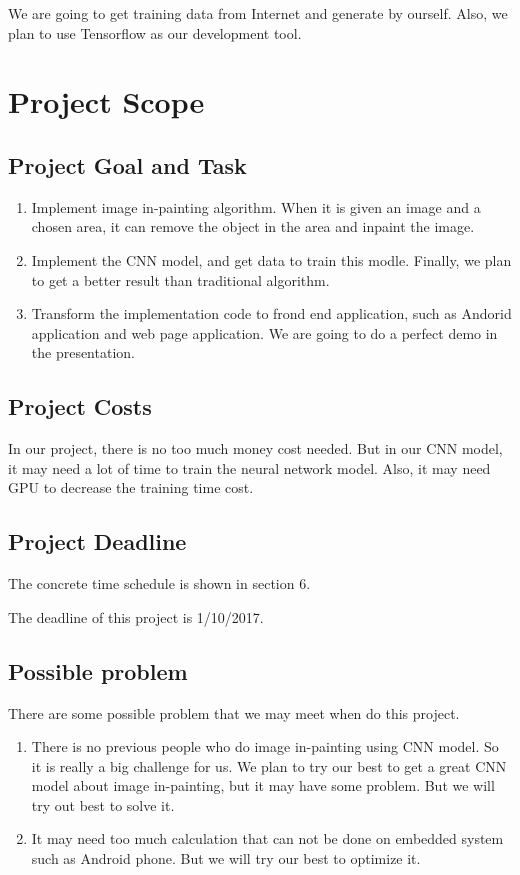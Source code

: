 \documentclass[12pt]{article}
\begin{document}
\qquad We are going to get training data from Internet and generate by ourself. Also, we plan to use Tensorflow as our development tool. 

\section{Project Scope}
\subsection{Project Goal and Task}
\begin{enumerate}[1.]
	\item Implement image in-painting algorithm. When it is given an image and a chosen area, it can remove the object in the area and inpaint the image.
	\item Implement the CNN model, and get data to train this modle. Finally, we plan to get a better result than traditional algorithm.
	\item Transform the implementation code to frond end application, such as Andorid application and web page application. We are going to do a perfect demo in the presentation. 
\end{enumerate}
\subsection{Project Costs}
\qquad In our project, there is no too much money cost needed. But in our CNN model, it may need a lot of time to train the neural network model. Also, it may need GPU to decrease the training time cost.
\subsection{Project Deadline}
\qquad The concrete time schedule is shown in section 6. 

\qquad The deadline of this project is 1/10/2017.
\subsection{Possible problem}
There are some possible problem that we may meet when do this project.
\begin{enumerate}[1.]
	\item There is no previous people who do image in-painting using CNN model. So it is really a big challenge for us. We plan to try our best to get a great CNN model about image in-painting, but it may have some problem. But we will try out best to solve it.
	\item It may need too much calculation that can not be done on embedded system such as Android phone. But we will try our best to optimize it. 
\end{enumerate}
\end{document}
